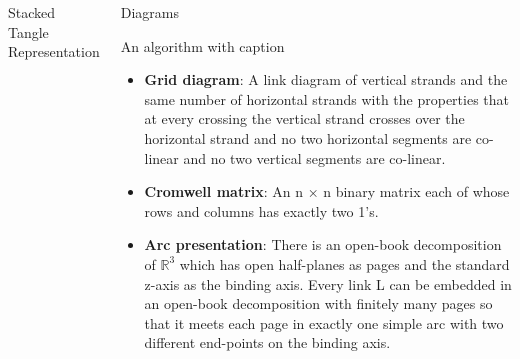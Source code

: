 \documentclass[final]{beamer}
\begin{document}
\begin{frame}[t]
\begin{columns}[t]
\begin{block}{Stacked Tangle Representation}
\begin{itemize}
  \end{itemize}

  

  
  \end{block}


  \begin{block}{Diagrams}

    

    \begin{Diagrams}
      \caption{An algorithm with caption}\label{alg:cap}
      \begin{itemize} 
        \item \textbf{Grid diagram}: A link diagram of vertical strands and the same number of horizontal strands with the properties that at every crossing the vertical strand crosses over the horizontal strand and no two horizontal segments are co-linear and no two vertical segments are co-linear.
        \item \textbf{Cromwell matrix}: An n × n binary matrix each of whose rows and columns has exactly two 1’s.
        \item \textbf{Arc presentation}: There is an open-book decomposition of $\mathbb{R}^3$ which has open half-planes as pages and the standard z-axis as the binding axis.
        Every link L can be embedded in an open-book decomposition with finitely many pages so that it meets each page in exactly one simple arc with two different end-points on the binding axis.
      \end{itemize}


\end{Diagrams}
\end{block}
\end{columns}
\end{frame}
\end{document}

